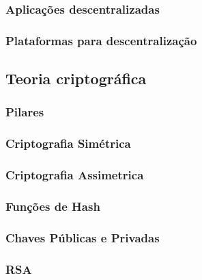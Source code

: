         \subsubsection{Aplicações descentralizadas}

        \subsubsection{Plataformas para descentralização}

\subsection{Teoria criptográfica}

    \subsubsection{Pilares}

    \subsubsection{Criptografia Simétrica}

    \subsubsection{Criptografia Assimetrica}
    
    \subsubsection{Funções de Hash}

    \subsubsection{Chaves Públicas e Privadas}

        \subsubsection{RSA}